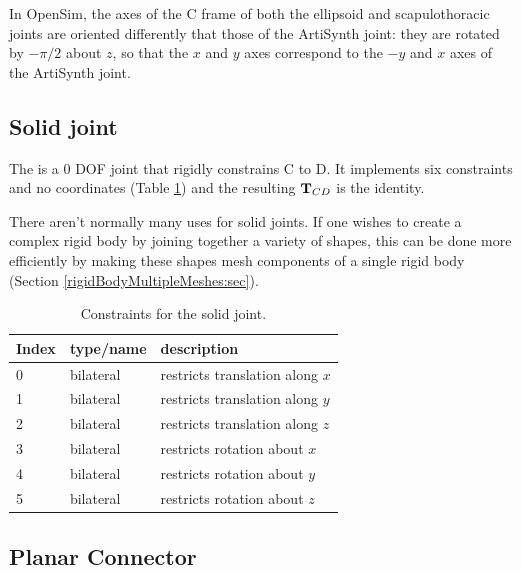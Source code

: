 \begin{sideblock}
In OpenSim, the axes of the C frame of both the ellipsoid and
scapulothoracic joints are oriented differently that those of the
ArtiSynth joint: they are rotated by $-\pi/2$ about $z$, so that the
$x$ and $y$ axes correspond to the $-y$ and $x$ axes of the ArtiSynth
joint.
\end{sideblock}

\subsection{Solid joint}

The  
is a 0 DOF joint that rigidly constrains C to D.  It
implements six constraints and no coordinates
(Table \ref{SolidJointConstraints:tbl}) and the resulting ${\bf T}_{CD}$ is the
identity.

\begin{sideblock}
There aren't normally many uses for solid joints. If one wishes to
create a complex rigid body by joining together a variety of shapes,
this can be done more efficiently by making these shapes mesh
components of a single rigid body
(Section \ref{rigidBodyMultipleMeshes:sec}).
\end{sideblock}

\begin{table}[h]
\centering
\begin{tabular}{|l|l|l|}
\hline
Index & type/name & description \\
\hline
0 & bilateral & restricts translation along $x$ \\
1 & bilateral & restricts translation along $y$ \\
2 & bilateral & restricts translation along $z$ \\
3 & bilateral & restricts rotation about $x$ \\
4 & bilateral & restricts rotation about $y$ \\
5 & bilateral & restricts rotation about $z$ \\
\hline
\end{tabular}
\caption{Constraints for the solid joint.}
\label{SolidJointConstraints:tbl}
\end{table}

\subsection{Planar Connector}

